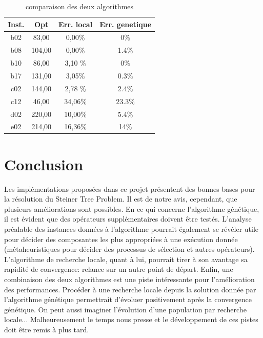 \documentclass[10pt]{article}
\begin{document}
	\begin{table}[h!]
		\centering
		\begin{tabular}{|c|c|c|c|}
		\hline
\textbf{Inst.}& \textbf{Opt} & \textbf{Err. local} &  \textbf{Err. genetique} \\
\hline
b02 & 83,00 & 0,00\% & 0\% \\
b08 & 104,00 & 0,00\% & 1.4\% \\
b10 & 86,00 & 3,10 \% & 0\% \\
b17 & 131,00 & 3,05\% & 0.3\%\\
c02 & 144,00 & 2,78 \% & 2.4\%\\
c12 & 46,00 & 34,06\%& 23.3\% \\
d02 & 220,00 & 10,00\% & 5.4\%\\
e02 & 214,00 & 16,36\% & 14\%\\
\hline
		\end{tabular}
		\caption{comparaison des deux algorithmes}
		\label{tab-perfcomp}
	\end{table}

\section{Conclusion}

	Les implémentations proposées dans ce projet présentent des bonnes bases pour la résolution du Steiner Tree Problem. Il est de notre avis, cependant, que plusieurs améliorations sont possibles. En ce qui concerne l'algorithme génétique, il est évident que des opérateurs supplémentaires doivent être testés. L'analyse préalable des instances données à l'algorithme pourrait également se révéler utile pour décider des composantes les plus appropriées à une exécution donnée (métaheuristiques pour décider des processus de sélection et autres opérateurs). L'algorithme de recherche locale, quant à lui, pourrait tirer à son avantage sa rapidité de convergence: relance sur un autre point de départ. Enfin, une combinaison des deux algorithmes est une piste intéressante pour l'amélioration des performances. Procéder à une recherche locale depuis la solution donnée par l'algorithme génétique permettrait d'évoluer positivement après la convergence génétique. On peut aussi imaginer l'évolution d'une population par recherche locale... Malheureusement le temps nous presse et le développement de ces pistes doit être remis à plus tard.
\end{document}
